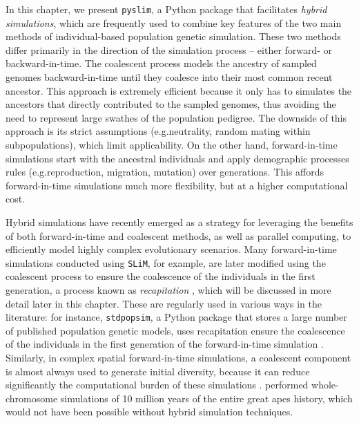 \documentclass[12pt]{article}
\newcommand{\slim}[0]{\texttt{SLiM}\xspace}
\newcommand{\pyslim}[0]{\texttt{pyslim}\xspace}
\newcommand{\stdpopsim}[0]{\texttt{stdpopsim}\xspace}
\newcommand*{\eg}{e.g.\xcomma}
\begin{document}
In this chapter, we present \pyslim, a Python package that facilitates \emph{hybrid simulations},
which are frequently used to combine key features of the two main methods of individual-based population genetic simulation.
These two methods differ primarily in the direction of the simulation
process -- either forward- or backward-in-time. 
The coalescent process models the ancestry of sampled genomes
backward-in-time until they coalesce into their most common recent ancestor. %
This approach is extremely efficient because it only has to simulates the ancestors that directly contributed to the sampled genomes,
thus avoiding the need to represent large swathes of the population pedigree. 
The downside of this approach is its strict assumptions (\eg neutrality, random mating within subpopulations), 
which limit applicability.
On the other hand, forward-in-time simulations start with the ancestral individuals and apply demographic processes rules (\eg reproduction, migration, mutation) over generations.
This affords forward-in-time simulations much more flexibility,
but at a higher computational cost.

Hybrid simulations have recently emerged as a strategy for leveraging the benefits of both forward-in-time and coalescent methods, as well as parallel computing,
to efficiently model highly complex evolutionary scenarios.
Many forward-in-time simulations conducted using \slim, for example, are later modified using the coalescent process to ensure the coalescence of the individuals in the first generation, a process known as \emph{recapitation} \citep{haller_tree-sequence_2019}, which will be discussed in more detail later in this chapter.
These are regularly used in various ways in the literature:
for instance, \stdpopsim, a Python package that stores a large number of published population genetic models,
uses recapitation ensure the coalescence of the individuals in the first generation of the forward-in-time simulation \citep{adrion_community-maintained_2020,elise_expanding_nodate,gower_accessible_2025}.
Similarly, in complex spatial forward-in-time simulations, a coalescent component is almost always used to generate initial diversity,
because it can reduce significantly the computational burden of these simulations \citep{battey_space_2020,petr_slendr_2023}.
\citet{rodrigues_shared_2024} performed whole-chromosome simulations of 10 million years of the entire great apes history,
which would not have been possible without hybrid simulation techniques.
\end{document}
